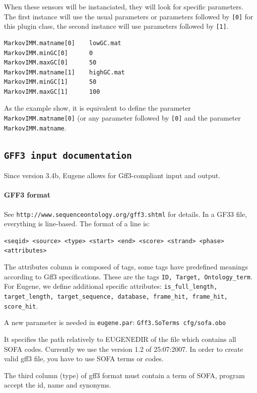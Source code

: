 \documentclass[a4paper,titlepage]{report}
\begin{document}
When these sensors will be instanciated, they will look for specific
parameters. The first instance will use the usual parameters or parameters 
followed by \texttt{[0]} for this plugin class, the second instance will use parameters 
followed by \texttt{[1]}.

\begin{Verbatim}
MarkovIMM.matname[0]    lowGC.mat 
MarkovIMM.minGC[0]      0
MarkovIMM.maxGC[0]      50
MarkovIMM.matname[1]    highGC.mat
MarkovIMM.minGC[1]      50
MarkovIMM.maxGC[1]      100
\end{Verbatim}

As the example show, it is equivalent to define the parameter
\texttt{MarkovIMM.matname[0]} (or any parameter followed by
\texttt{[0]} and the parameter \texttt{MarkovIMM.matname}.

\subsection{\texttt{GFF3 input documentation}} 

Since version 3.4b, Eugene allows for Gff3-compliant input and output.

\paragraph{GFF3 format}

See \texttt{http://www.sequenceontology.org/gff3.shtml} for details.
In a GF33 file, everything is line-based. The format of a line is:

\verb!<seqid> <source> <type> <start> <end> <score> <strand> <phase><attributes>!

The attributes column is composed of tags, some tags have predefined
meanings according to Gff3 specifications. These are the tags
\texttt{ID, Target, Ontology\_term}.  For Eugene, we define additional
specific attributes: \texttt{is\_full\_length, target\_length,
  target\_sequence, database, frame\_hit, frame\_hit, score\_hit}.

A new parameter is needed in \texttt{eugene.par}: 
\texttt{Gff3.SoTerms		cfg/sofa.obo}

It specifies the path relatively to EUGENEDIR of the file which contains
all SOFA codes. Currently we use the version 1.2 of 25:07:2007. In order
to create valid gff3 file, you have to use SOFA terms or codes.

The third column (type) of gff3 format must contain a term of SOFA,
program accept the id, name and synonyms.
\end{document}
